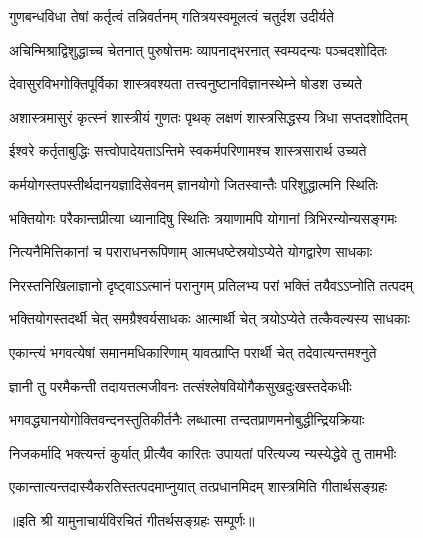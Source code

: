 \twolineshloka
{गुणबन्धविधा तेषां कर्तृत्वं तन्निवर्तनम्}
{गतित्रयस्वमूलत्वं चतुर्दश उदीर्यते}

\twolineshloka
{अचिन्मिश्राद्विशुद्धाच्च चेतनात् पुरुषोत्तमः}
{व्यापनाद्भरनात् स्वम्यदन्यः पञ्चदशोदितः}

\twolineshloka
{देवासुरविभगोक्तिपूर्विका शास्त्रवश्यता}
{तत्त्वनुष्टानविज्ञानस्थेम्ने षोडश उच्यते}

\twolineshloka
{अशास्त्रमासुरं कृत्स्नं शास्त्रीयं गुणतः पृथक्}
{लक्षणं शास्त्रसिद्धस्य त्रिधा सप्तदशोदितम्}

\twolineshloka
{ईश्वरे कर्तृताबुद्धिः सत्त्वोपादेयताऽन्तिमे}
{स्वकर्मपरिणामश्च शास्त्रसारार्थ उच्यते}

\twolineshloka
{कर्मयोगस्तपस्तीर्थदानयज्ञादिसेवनम्}
{ज्ञानयोगो जितस्वान्तैः परिशुद्धात्मनि स्थितिः}

\twolineshloka
{भक्तियोगः परैकान्तप्रीत्या ध्यानादिषु स्थितिः}
{त्रयाणामपि योगानां त्रिभिरन्योन्यसङ्गमः}

\twolineshloka
{नित्यनैमित्तिकानां च पराराधनरूपिणाम्}
{आत्मधष्टेस्रयोऽप्येते योगद्वारेण साधकाः}

\twolineshloka
{निरस्तनिखिलाज्ञानो दृष्ट्वाऽऽत्मानं परानुगम्}
{प्रतिलभ्य परां भक्तिं तयैवऽऽप्नोति तत्पदम्}

\twolineshloka
{भक्तियोगस्तदर्थी चेत् समग्रैश्वर्यसाधकः}
{आत्मार्थी चेत् त्रयोऽप्येते तत्कैवल्यस्य साधकाः}

\twolineshloka
{एकान्त्यं भगवत्येषां समानमधिकारिणाम्}
{यावत्प्राप्ति परार्थी चेत् तदेवात्यन्तमश्नुते}

\twolineshloka
{ज्ञानी तु परमैकन्ती तदायत्तत्मजीवनः}
{तत्संश्लेषवियोगैकसुखदुःखस्तदेकधीः}

\twolineshloka
{भगवद्\mbox{}ध्यानयोगोक्तिवन्दनस्तुतिकीर्तनैः}
{लब्धात्मा तन्दतप्राणमनोबुद्धीन्द्रियक्रियाः}

\twolineshloka
{निजकर्मादि भक्त्यन्तं कुर्यात् प्रीत्यैव कारितः}
{उपायतां परित्यज्य न्यस्येद्धेवे तु तामभीः}

\twolineshloka
{एकान्तात्यन्तदास्यैकरतिस्तत्पदमाप्नुयात्}
{तत्प्रधानमिदम् शास्त्रमिति गीतार्थसङ्ग्रहः}

॥इति श्री यामुनाचार्यविरचितं गीतर्थसङ्ग्रहः सम्पूर्णः॥